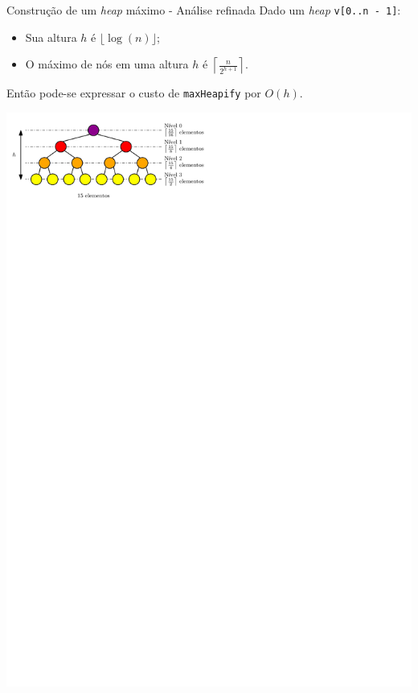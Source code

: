 \documentclass[t, 10pt]{beamer}
\begin{document}
  \begin{frame}[fragile]{Construção de um \emph{heap} máximo - Análise refinada}
    Dado um \emph{heap} \texttt{v[0..n - 1]}:
    
    \begin{itemize}
      \item Sua altura $h$ é $\lfloor\log(n)\rfloor$;
      \item O máximo de nós em uma altura $h$ é $\left\lceil\frac{n}{2^{h + 1}}\right\rceil$.
    \end{itemize}
    
    Então pode-se expressar o custo de \texttt{maxHeapify} por $O(h)$.
    
    \vspace{1em}
    \begin{center}
      \includegraphics[width=\textwidth]{img/img19.pdf}
    \end{center}   
  \end{frame}
\end{document}
